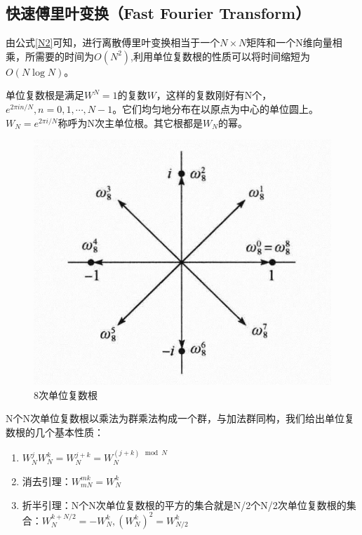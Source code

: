 \subsection{快速傅里叶变换（Fast Fourier Transform）}
由公式\ref{N2}可知，进行离散傅里叶变换相当于一个$N\times N$矩阵和一个N维向量相乘，所需要的时间为$O(N^2)$,利用单位复数根的性质可以将时间缩短为$O(N\log{N})$\cite{suan}。
\begin{tauenv}[frametitle=单位复数根]
    单位复数根是满足$W^N=1$的复数$W$，这样的复数刚好有N个，$e^{2\pi in/N},n=0,1,\cdots,N-1$。它们均匀地分布在以原点为中心的单位圆上。$W_N=e^{2\pi i/N}$称呼为N次主单位根。其它根都是$W_N$的幂。
\end{tauenv}
\begin{figure}[h]
    \centering
    \includegraphics[width=\linewidth]{figures/FFT1}
    \caption{8次单位复数根}
\end{figure}
N个N次单位复数根以乘法为群乘法构成一个群，与加法群同构，我们给出单位复数根的几个基本性质：
\begin{enumerate}
    \item $W_N^jW_N^k=W_N^{j+k}=W_N^{(j+k)\mod N}$
    \item 消去引理：$W_{mN}^{mk}=W_N^k$
    \item 折半引理：N个N次单位复数根的平方的集合就是N/2个N/2次单位复数根的集合：$W_N^{k+N/2}=-W_N^k,(W_N^k)^2=W_{N/2}^k$
\end{enumerate}

